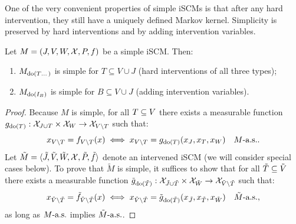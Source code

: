 One of the very convenient properties of simple iSCMs is that after any hard intervention, they still have a uniquely defined Markov kernel.
Simplicity is preserved by hard interventions and by adding intervention variables.
\begin{Prp}\label{prp:scm_simplicity_preserved_by_interventions}
  Let $M = \left ( J, V, W, \mathcal{X}, P, f \right )$ be a simple iSCM. Then:
    \begin{enumerate}
      \item $M_{\operatorname{do}(T\dots)}$ is simple for $T \subseteq V \cup J$ (hard interventions of all three types);
      \item $M_{\operatorname{do}(I_B)}$ is simple for $B \subseteq V \cup J$ (adding intervention variables).
    \end{enumerate}
\end{Prp}
\begin{proof}
  Because $M$ is simple, for all $T \subseteq V$ there exists a measurable function $g_{\operatorname{do}(T)} : \mathcal{X}_{J \cup T} \times \mathcal{X}_W \to \mathcal{X}_{V\setminus T}$ such that:
    $$x_{V\setminus T} = f_{V\setminus T}(x) \iff x_{V\setminus T} = g_{\operatorname{do}(T)}(x_J, x_T, x_W)\quad M\text{-a.s.}.$$
  Let $\tilde{M} = \langle \tilde{J}, \tilde{V}, \tilde{W}, \mathcal{X}, \tilde{P}, \tilde{f}\rangle$ denote an intervened iSCM (we will consider special cases below).
  To prove that $\tilde{M}$ is simple, it suffices to show that for all $\tilde{T} \subseteq \tilde{V}$ there exists a measurable function
    $\tilde{g}_{\operatorname{do}(\tilde{T})} : \mathcal{X}_{\tilde{J} \cup \tilde{T}} \times \mathcal{X}_{\tilde{W}} \to \mathcal{X}_{\tilde{V}\setminus \tilde{T}}$ such that:
    $$x_{\tilde{V}\setminus \tilde{T}} = \tilde{f}_{\tilde{V}\setminus \tilde{T}}(x) \iff x_{\tilde{V}\setminus \tilde{T}} = \tilde{g}_{\operatorname{do}(\tilde{T})}(x_{\tilde{J}}, x_{\tilde{T}}, x_{\tilde{W}})\quad \tilde{M}\text{-a.s.},$$
  as long as $M\text{-a.s.}$ implies $\tilde{M}\text{-a.s.}$.


\end{proof}
